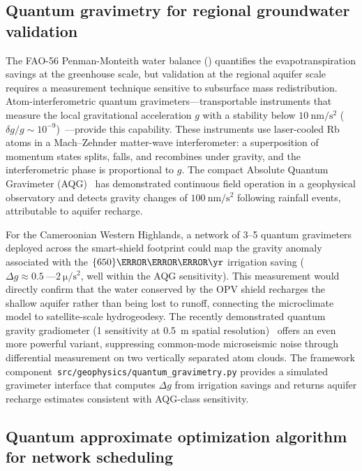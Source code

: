 \documentclass[11pt,a4paper]{article}
\begin{document}
\subsection{Quantum gravimetry for regional groundwater validation}
\label{SI-sec:gravimetry}

The FAO-56 Penman-Monteith water balance ()
quantifies the evapotranspiration savings at the greenhouse scale, but
validation at the regional aquifer scale requires a measurement technique
sensitive to subsurface mass redistribution. Atom-interferometric quantum
gravimeters---transportable instruments that measure the local gravitational
acceleration $g$ with a stability below $\qty{10}{\nm\per\s\squared}$
($\delta g/g \sim 10^{-9}$)~\cite{Menoret2018}---provide this capability.
These instruments use laser-cooled Rb atoms in a Mach--Zehnder
matter-wave interferometer: a superposition of momentum states splits, falls,
and recombines under gravity, and the interferometric phase is proportional to
$g$. The compact Absolute Quantum Gravimeter (AQG)~\cite{Menoret2018} has
demonstrated continuous field operation in a geophysical observatory and detects
gravity changes of $\qty{100}{\nm\per\s\squared}$ following rainfall events,
attributable to aquifer recharge.

For the Cameroonian Western Highlands, a network of 3--5 quantum gravimeters
deployed across the smart-shield footprint could map the gravity anomaly
associated with the $\qty{650}{\m\cubed\per\yr}$ irrigation saving
($\Delta g \approx \qty{0.5}{\text{---}}\qty{2}{\micro\per\s\squared}$,
well within the AQG sensitivity). This measurement would directly confirm that
the water conserved by the OPV shield recharges the shallow aquifer rather
than being lost to runoff, connecting the microclimate model to satellite-scale
hydrogeodesy. The recently demonstrated quantum gravity gradiometer (\qty{1}{}
sensitivity at \qty{0.5}{\m} spatial resolution)~\cite{Stray2022} offers an even
more powerful variant, suppressing common-mode microseismic noise through
differential measurement on two vertically separated atom clouds.
The framework component~\texttt{src/geophysics/quantum\_gravimetry.py} provides
a simulated gravimeter interface that computes $\Delta g$ from irrigation
savings and returns aquifer recharge estimates consistent with AQG-class
sensitivity.

\subsection{Quantum approximate optimization algorithm for network scheduling}
\label{SI-sec:qaoa}
\end{document}
